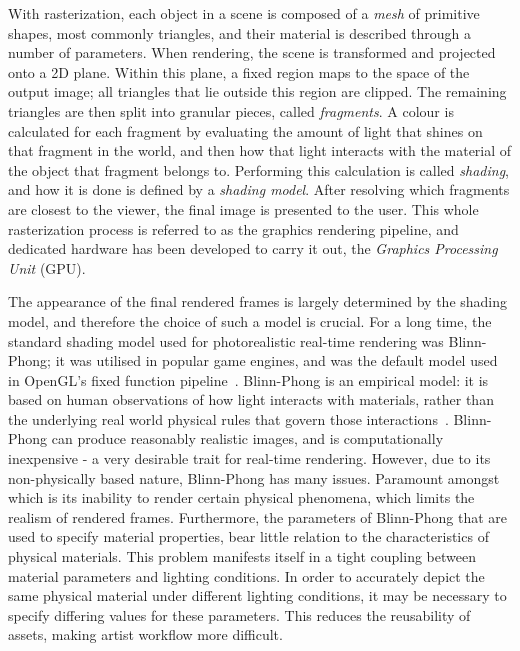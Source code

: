 With rasterization, each object in a scene is composed of a \textit{mesh} of primitive shapes, most commonly triangles, and their material is described through a number of parameters. When rendering, the scene is transformed and projected onto a 2D plane. Within this plane, a fixed region maps to the space of the output image; all triangles that lie outside this region are clipped. The remaining triangles are then split into granular pieces, called \textit{fragments}. A colour is calculated for each fragment by evaluating the amount of light that shines on that fragment in the world, and then how that light interacts with the material of the object that fragment belongs to. Performing this calculation is called \textit{shading}, and how it is done is defined by a \textit{shading model}. After resolving which fragments are closest to the viewer, the final image is presented to the user. This whole rasterization process is referred to as the graphics rendering pipeline, and dedicated hardware has been developed to carry it out, the \textit{Graphics Processing Unit} (GPU).

The appearance of the final rendered frames is largely determined by the shading model, and therefore the choice of such a model is crucial. For a long time, the standard shading model used for photorealistic real-time rendering was Blinn-Phong; it was utilised in popular game engines, and was the default model used in OpenGL's fixed function pipeline~\cite{UnityBlinnPhong, UnrealBlinnPhong, OpenGLBlinnPhongFixedFunction}. Blinn-Phong is an empirical model: it is based on human observations of how light interacts with materials, rather than the underlying real world physical rules that govern those interactions~\cite{PhongShading}. Blinn-Phong can produce reasonably realistic images, and is computationally inexpensive - a very desirable trait for real-time rendering. However, due to its non-physically based nature, Blinn-Phong has many issues. Paramount amongst which is its inability to render certain physical phenomena, which limits the realism of rendered frames. Furthermore, the parameters of Blinn-Phong that are used to specify material properties, bear little relation to the characteristics of physical materials. This problem manifests itself in a tight coupling between material parameters and lighting conditions. In order to accurately depict the same physical material under different lighting conditions, it may be necessary to specify differing values for these parameters. This reduces the reusability of assets, making artist workflow more difficult.

